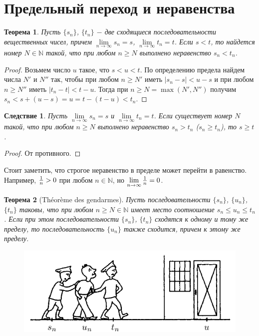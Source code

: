 \documentclass{article}
\newtheorem{theorem}{Теорема}[section]
\newtheorem*{consequence}{Следствие}
\begin{document}
\section{Предельный переход и неравенства}

\begin{theorem}
Пусть \(\{s_n\}\), \(\{t_n\}\) \(-\) две сходящиеся последовательности вещественных чисел, причем \(\lim\limits_{n \to \infty} s_n = s\), \(\lim\limits_{n \to \infty} t_n = t\). Если \(s < t\), то найдется номер \(N \in \mathbb{N}\) такой, что при любом \(n \geq N\) выполнено неравенство \(s_n < t_n\).
\end{theorem}

\begin{proof}
Возьмем число \(u\) такое, что \(s < u < t\). По определению предела найдем числа \(N'\) и \(N''\) так, чтобы при любом \(n \geq N'\) иметь \(|s_n - s| < u - s\) и при любом \(n \geq N''\) иметь \(|t_n - t| < t - u\). Тогда при \(n \geq N = \max(N', N'')\) получим \(s_n < s + (u - s) = u = t - (t - u) < t_n\).
\end{proof}

\begin{consequence}
Пусть \(\lim\limits_{n \to \infty} s_n = s\) и \(\lim\limits_{n \to \infty} t_n = t\). Если существует номер \(N\) такой, что при любом \(n \geq N\) выполнено неравенство \(s_n > t_n\) (\(s_n \geq t_n\)), то \(s \geq t\).
\end{consequence}

\begin{proof}
От противного.
\end{proof}

Стоит заметить, что строгое неравенство в пределе может перейти в равенство. Например, \({1 \over n} > 0\) при любом \(n \in \mathbb{N}\), но \(\lim\limits_{n \to \infty} {1 \over n} = 0\).

\begin{theorem}[Théorème des gendarmes]
Пусть последовательности \(\{s_n\}\), \(\{u_n\}\), \(\{t_n\}\) таковы, что при любом \(n \geq N \in \mathbb{N}\) имеет место соотношение \(s_n \leq u_n \leq t_n\). Если при этом последовательности \(\{s_n\}\), \(\{t_n\}\) сходятся к одному и тому же пределу, то последовательность \(\{u_n\}\) также сходится, причем к этому же пределу.
\end{theorem}

\begin{figure}[h]
\centering
\includegraphics[scale=0.35]{SqueezeTheorem}
\end{figure}
\end{document}
